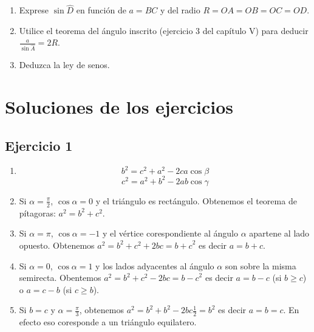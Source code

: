 \begin{center}
\end{center}

\begin{enumerate}
\item Exprese $\sin \widehat{D}$ en función de $a = BC$ y del radio
  $R = OA = OB = OC = OD$.
\item Utilice el teorema del ángulo inscrito
  (ejercicio 3 del capítulo V) para deducir 
  $\frac{a}{\sin \widehat{A}} = 2R$.
\item Deduzca la ley de senos. 
\end{enumerate}

\section{Soluciones de los ejercicios}

\subsection{Ejercicio 1}

\begin{enumerate}
\item 
  $$b^2 = c^2 + a^2 - {2ca \cos \beta}$$
  $$c^2 = a^2 + b^2 - {2ab \cos \gamma}$$

\item Si $\alpha = \frac{\pi}{2}$, $\cos \alpha = 0$ y el triángulo es
  rectángulo. Obtenemos el teorema de pítagoras: $a^2 = b^2+c^2$.
\item Si $\alpha = \pi$, $\cos \alpha = -1$ y el vértice corespondiente
  al ángulo $\alpha$ apartene al lado opuesto. Obtenemos 
  $a^2 = b^2 + c^2 + {2bc} = {b+c}^2$ es decir $a = b + c$.
\item Si $\alpha = 0$, $\cos \alpha = 1$ y los lados adyacentes al ángulo
  $\alpha$ son sobre la misma semirecta. Obentemos
  $a^2 = b^2 + c^2 - {2bc} = {b-c}^2$ es decir $a = b - c$ (si $b \geq c$) o
  $a = c - b$ (si $c \geq b$).  
\item Si $b = c$ y $\alpha = \frac{\pi}{3}$, obtenemos
  $a^2 = b^2 + b^2 - {2bc\frac{1}{2}} = b^2$ es decir $a=b=c$. En efecto
  eso coresponde a un triángulo equilatero.

\end{enumerate}

